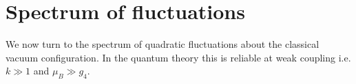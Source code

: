 

\section{Spectrum of fluctuations}
\label{sec3}
We now turn to the spectrum of quadratic fluctuations about the classical vacuum configuration. In the quantum theory this is reliable at weak coupling i.e. $k\gg 1$ and $\mu_B\gg g_4$. 
